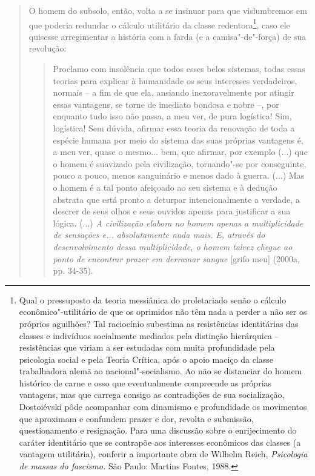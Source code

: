 {\begin{quote}
O homem do subsolo, então, volta a se insinuar para que vislumbremos em
que poderia redundar o cálculo utilitário da classe redentora\footnote{Qual
  o pressuposto da teoria messiânica do proletariado senão o cálculo
  econômico"-utilitário de que os oprimidos não têm nada a perder a não
  ser os próprios aguilhões? Tal raciocínio subestima as resistências
  identitárias das classes e indivíduos socialmente mediados pela
  distinção hierárquica -- resistências que viriam a ser estudadas com
  muita profundidade pela psicologia social e pela Teoria Crítica, após
  o apoio maciço da classe trabalhadora alemã ao nacional"-socialismo. Ao
  não se distanciar do homem histórico de carne e osso que eventualmente
  compreende as próprias vantagens, mas que carrega consigo as
  contradições de sua socialização, Dostoiévski pôde acompanhar com
  dinamismo e profundidade os movimentos que aproximam e confundem
  prazer e dor, revolta e submissão, questionamento e resignação. Para
  uma discussão sobre o enrijecimento do caráter identitário que se
  contrapõe aos interesses econômicos das classes (a vantagem
  utilitária), conferir a importante obra de Wilhelm Reich,
  \emph{Psicologia de massas do fascismo.} São Paulo: Martins Fontes,
  1988.}, caso ele quisesse arregimentar a história com a farda (e a
camisa"-de"-força) de sua revolução:

\begin{quote}
Proclamo com insolência que todos esses belos sistemas, todas essas
teorias para explicar à humanidade os seus interesses verdadeiros,
normais -- a fim de que ela, ansiando inexoravelmente por atingir essas
vantagens, se torne de imediato bondosa e nobre --, por enquanto tudo
isso não passa, a meu ver, de pura logística! Sim, logística! Sem
dúvida, afirmar essa teoria da renovação de toda a espécie humana por
meio do sistema das suas próprias vantagens é, a meu ver, quase o
mesmo... bem, que afirmar, por exemplo (...) que o homem é suavizado
pela civilização, tornando"-se por conseguinte, pouco a pouco, menos
sanguinário e menos dado à guerra. (...) Mas o homem é a tal ponto
afeiçoado ao seu sistema e à dedução abstrata que está pronto a deturpar
intencionalmente a verdade, a descrer de seus olhos e seus ouvidos
apenas para justificar a sua lógica. (...) \emph{A civilização elabora
no homem apenas a multiplicidade de sensações e... absolutamente nada
mais. E, através do desenvolvimento dessa multiplicidade, o homem talvez
chegue ao ponto de encontrar prazer em derramar sangue} {[}grifo meu{]}
(2000a, pp. 34-35).
\end{quote}


\end{quote}}
